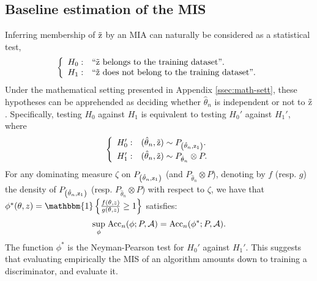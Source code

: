\subsection{Baseline estimation of the MIS}
\label{ssec:baseline_estimation}
Inferring membership of $\Tilde{{\textnormal{z}}}$ by an MIA can naturally be considered as a statistical test,
\begin{equation*}
\left\{
    \begin{array}{ll}
  H_0: &``\Tilde{{\textnormal{z}}}{\text{ belongs to the training dataset}}".  \\
  H_1: & ``\Tilde{{\textnormal{z}}}{\text{ does not belong to the training dataset}}".
\end{array}\right.
\end{equation*}
Under the mathematical setting presented in Appendix \ref{ssec:math-sett}, these hypotheses can be apprehended as deciding whether $\hat{\theta}_n$ is independent or not to $\Tilde{{\textnormal{z}}}$. Specifically, testing $H_0$ against $H_1$ is equivalent to testing $H_0'$ against $H_1'$, where
\begin{equation}
\left\{
    \begin{array}{ll}
    H_0': & (\hat{\theta}_n, \Tilde{{\textnormal{z}}})\sim P_{\left(\hat{\theta}_n,{\textnormal{z}}_1\right)}. \\
    H_1': & (\hat{\theta}_n,\Tilde{{\textnormal{z}}})\sim P_{\hat{\theta}_n}\otimes P.
\end{array}\right. 
\end{equation}
For any dominating measure $\zeta$ on $P_{\left(\hat{\theta}_n,{\textnormal{z}}_1\right)}$ (and $P_{\hat{\theta}_n}\otimes P$), denoting by $f$ (resp. $g$) the density of  $P_{\left(\hat{\theta}_n,{\textnormal{z}}_1\right)}$ (resp. $P_{\hat{\theta}_n}\otimes P$) with respect to $\zeta$, we have that $\phi^*(\theta, z) = \mathbbm{1}\left\{\frac{f(\theta,z)}{g(\theta,z)} \geq1\right\}$ satisfies:
\begin{equation}
    \underset{\phi}{\sup}\;{\text{Acc}}_n(\phi; P,{\mathcal{A}} ) = {\text{Acc}}_n(\phi^*; P,{\mathcal{A}} ).
\end{equation}
\noindent The function $\phi^*$ is the Neyman-Pearson test for $H_0'$ against $H_1'$. This suggests that evaluating empirically the MIS of an algorithm amounts down to training a discriminator, and evaluate it.
